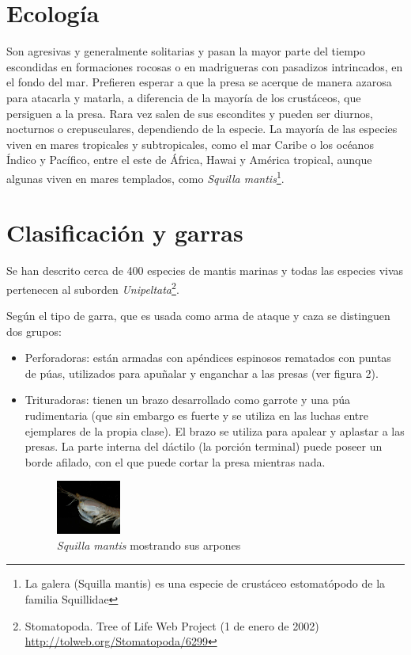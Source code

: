 \documentclass[10pt,twocolumn]{article}
\begin{document}
\section{Ecología}

Son agresivas y generalmente solitarias y pasan la mayor parte del tiempo escondidas en formaciones rocosas o en madrigueras con pasadizos intrincados, en el fondo del mar. Prefieren esperar a que la presa se acerque de manera azarosa para atacarla y matarla, a diferencia de la mayoría de los crustáceos, que persiguen a la presa. Rara vez salen de sus escondites y pueden ser diurnos, nocturnos o crepusculares, dependiendo de la especie. La mayoría de las especies viven en mares tropicales y subtropicales, como el mar Caribe o los océanos Índico y Pacífico, entre el este de África, Hawai y América tropical, aunque algunas viven en mares templados, como \textit{Squilla mantis}\footnote {La galera (Squilla mantis) es una especie de crustáceo estomatópodo de la familia Squillidae}.

\section{Clasificación y garras
}
Se han descrito cerca de 400 especies de mantis ma\-ri\-nas y todas las especies vivas pertenecen al sub\-or\-den \textit{Unipeltata}\footnote{Stomatopoda. Tree of Life Web Project (1 de enero de 2002) \url{http://tolweb.org/Stomatopoda/6299}}.

Según el tipo de garra, que es usada como arma de ataque y caza se distinguen dos grupos:

\begin{itemize}
	\item  Perforadoras: están armadas con apéndices espinosos rematados con puntas de púas, utilizados para apuñalar y enganchar a las presas (ver figura 2).
	\item Trituradoras: tienen un brazo desarrollado como garrote y una púa rudimentaria (que sin embargo es fuerte y se utiliza en las luchas entre ejemplares de la propia clase). El brazo se utiliza para apalear y aplastar a las presas. La parte interna del dáctilo (la porción terminal) puede poseer un borde afilado, con el que puede cortar la presa mientras nada.
\begin{figure}[h] 
	\centering
	\includegraphics[width=0.2\textwidth]{img/squilla_mantis.jpg}
	\caption{\textit{Squilla mantis}  mostrando sus arpones}
\end{figure}
\end{itemize}
\end{document}
